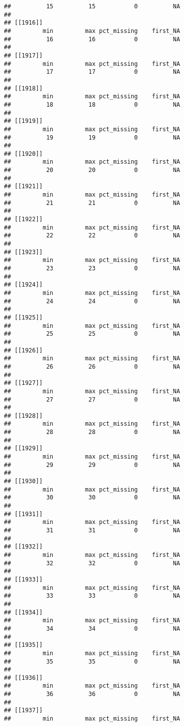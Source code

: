 \documentclass[
]{article}
\begin{document}
\begin{verbatim}
##          15          15           0          NA 
## 
## [[1916]]
##         min         max pct_missing    first_NA 
##          16          16           0          NA 
## 
## [[1917]]
##         min         max pct_missing    first_NA 
##          17          17           0          NA 
## 
## [[1918]]
##         min         max pct_missing    first_NA 
##          18          18           0          NA 
## 
## [[1919]]
##         min         max pct_missing    first_NA 
##          19          19           0          NA 
## 
## [[1920]]
##         min         max pct_missing    first_NA 
##          20          20           0          NA 
## 
## [[1921]]
##         min         max pct_missing    first_NA 
##          21          21           0          NA 
## 
## [[1922]]
##         min         max pct_missing    first_NA 
##          22          22           0          NA 
## 
## [[1923]]
##         min         max pct_missing    first_NA 
##          23          23           0          NA 
## 
## [[1924]]
##         min         max pct_missing    first_NA 
##          24          24           0          NA 
## 
## [[1925]]
##         min         max pct_missing    first_NA 
##          25          25           0          NA 
## 
## [[1926]]
##         min         max pct_missing    first_NA 
##          26          26           0          NA 
## 
## [[1927]]
##         min         max pct_missing    first_NA 
##          27          27           0          NA 
## 
## [[1928]]
##         min         max pct_missing    first_NA 
##          28          28           0          NA 
## 
## [[1929]]
##         min         max pct_missing    first_NA 
##          29          29           0          NA 
## 
## [[1930]]
##         min         max pct_missing    first_NA 
##          30          30           0          NA 
## 
## [[1931]]
##         min         max pct_missing    first_NA 
##          31          31           0          NA 
## 
## [[1932]]
##         min         max pct_missing    first_NA 
##          32          32           0          NA 
## 
## [[1933]]
##         min         max pct_missing    first_NA 
##          33          33           0          NA 
## 
## [[1934]]
##         min         max pct_missing    first_NA 
##          34          34           0          NA 
## 
## [[1935]]
##         min         max pct_missing    first_NA 
##          35          35           0          NA 
## 
## [[1936]]
##         min         max pct_missing    first_NA 
##          36          36           0          NA 
## 
## [[1937]]
##         min         max pct_missing    first_NA 

\end{verbatim}
\end{document}

